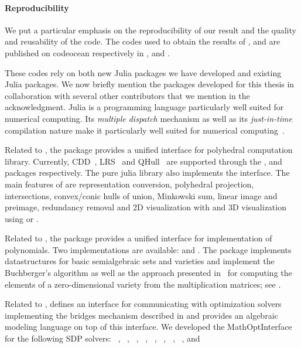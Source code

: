 \paragraph{Reproducibility}
We put a particular emphasis on the reproducibility of our result
and the quality and reusability of the code.
The codes used to obtain the results of ,  and 
are published on codeocean respectively in \cite{c2816dff-2bf4-43b8-bb71-f78ab352d9ae}, \cite{legat2020certifyingCO} and \cite{legat2020piecewiseCO}.

These codes rely on both new Julia packages we have developed and existing Julia packages.
We now briefly mention the packages developed for this thesis in collaboration with several other contributors that we mention in the acknowledgment. %
Julia is a programming language particularly well suited for numerical computing.
Its \emph{multiple dispatch} mechanism as well as its \emph{just-in-time} compilation nature
make it particularly well suited for numerical computing~\cite{bezanson2017julia}.

Related to , the package  provides a unified interface for polyhedral computation library.
Currently, CDD~\cite{fukuda2003cdd}, LRS~\cite{avis2000revised} and QHull~\cite{barber1996quickhull} are supported through the ,  and  packages respectively. The  pure julia library also implements the  interface.
The main features of  are representation conversion, polyhedral projection, intersections, convex/conic hulls of union, Minkowski sum, linear image and preimage, redundancy removal and 2D visualization with  and 3D visualization using  or .

Related to , the package  provides a unified interface for implementation of polynomials.
Two implementations are available:  and .
The package  implements datastructures for basic semialgebraic sets
and varieties and implement the Buchberger's algorithm
as well as the approach presented in~\cite{manocha1995algorithms} for computing the
elements of a zero-dimensional variety from the multiplication matrices; see .

Related to ,  defines an interface
for communicating with optimization solvers implementing the
bridges mechanism described in 
and  provides an algebraic modeling language on top of this interface.
We developed the MathOptInterface for the following SDP solvers:
~\cite{zheng2020chordal},
~\cite{borchers1999csdp},
~\cite{dsdp1},
~\cite{mosek2017mosek81082},
~\cite{ocpb:16},
~\cite{yamashita2003implementation},
~\cite{tutuncu2003solving},
~\cite{yang2015sdpnal},
and ~\cite{sturm1999using}

